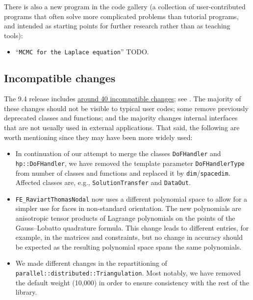 \documentclass{ansarticle-preprint}
\begin{document}
There is also a new program in the code gallery (a collection of
user-contributed programs that often solve more complicated problems
than tutorial programs, and intended as starting points for further
research rather than as teaching tools):
\begin{itemize}
\item ``\texttt{MCMC for the Laplace equation}'' TODO.
\end{itemize}



\subsection{Incompatible changes}\label{subsec:deprecated}

The 9.4 release includes
\href{https://dealii.org/developer/doxygen/deal.II/changes_between_9_3_0_and_9_4_0.html}
{around 40 incompatible changes}; see \cite{changes94}. The majority of these changes
should not be visible to typical user codes; some remove previously
deprecated classes and functions; and the majority changes internal
interfaces that are not usually used in external
applications. That said, the following are worth mentioning since they
may have been more widely used:
\begin{itemize}
  \item In continuation of our attempt to merge the classes \texttt{DoFHandler} and \texttt{hp::DoFHandler}, we have removed the
  template parameter \texttt{DoFHandlerType} from number of classes and
  functions and replaced it by \texttt{dim}/\texttt{spacedim}. Affected
  classes are, e.g., \texttt{SolutionTransfer} and \texttt{DataOut}. 
  \item \texttt{FE\_RaviartThomasNodal} now uses a different polynomial space to allow
  for a simpler use for faces in non-standard orientation. The new polynomials
  are anisotropic tensor products of Lagrange polynomials on the points of the
  Gauss--Lobatto quadrature formula. This change leads to different entries, for example, in
  the matrices and constraints, but no change in accuracy should be expected as the resulting polynomial
  space spans the same polynomials.
  \item We made different changes in the repartitioning of \texttt{parallel::distributed::Triangulation}. Most notably, we have
  removed the default weight (10,000) in order to ensure consistency with the rest
  of the library.
\end{itemize}
\end{document}
